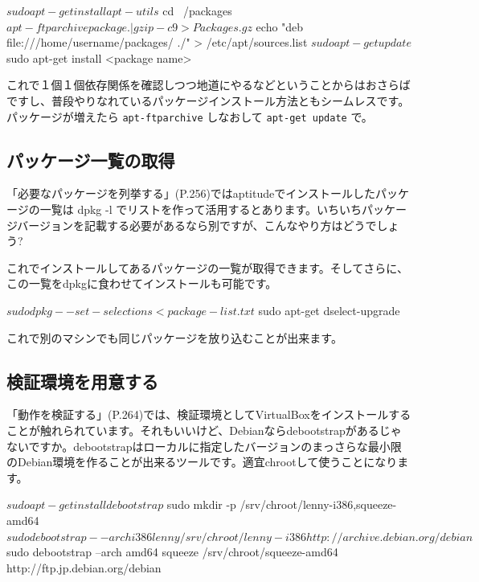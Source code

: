 \documentclass[mingoth,a4paper]{jsarticle}
\begin{document}
\begin{commandline}
$ sudo apt-get install apt-utils
$ cd ~/packages
$ apt-ftparchive package . | gzip -c9 > Packages.gz
$ echo "deb file:///home/username/packages/ ./" > /etc/apt/sources.list
$ sudo apt-get update
$ sudo apt-get install <package name>
\end{commandline}

これで１個１個依存関係を確認しつつ地道にやるなどということからはおさらばですし、普段やりなれているパッケージインストール方法ともシームレスです。パッケージが増えたら \texttt{apt-ftparchive} しなおして \texttt{apt-get update} で。


\subsection{パッケージ一覧の取得}

「必要なパッケージを列挙する」(P.256)ではaptitudeでインストールしたパッケージの一覧は dpkg -l でリストを作って活用するとあります。いちいちパッケージバージョンを記載する必要があるなら別ですが、こんなやり方はどうでしょう?


これでインストールしてあるパッケージの一覧が取得できます。そしてさらに、この一覧をdpkgに食わせてインストールも可能です。

\begin{commandline}
$ sudo dpkg --set-selections < package-list.txt
$ sudo apt-get dselect-upgrade
\end{commandline}

これで別のマシンでも同じパッケージを放り込むことが出来ます。


\subsection{検証環境を用意する}

「動作を検証する」(P.264)では、検証環境としてVirtualBoxをインストールすることが触れられています。それもいいけど、Debianならdebootstrapがあるじゃないですか。debootstrapはローカルに指定したバージョンのまっさらな最小限のDebian環境を作ることが出来るツールです。適宜chrootして使うことになります。

\begin{commandline}
$ sudo apt-get install debootstrap
$ sudo mkdir -p /srv/chroot/{lenny-i386,squeeze-amd64}
$ sudo debootstrap --arch i386 lenny /srv/chroot/lenny-i386 http://archive.debian.org/debian
$ sudo debootstrap --arch amd64 squeeze /srv/chroot/squeeze-amd64 http://ftp.jp.debian.org/debian
\end{commandline}
\end{document}
